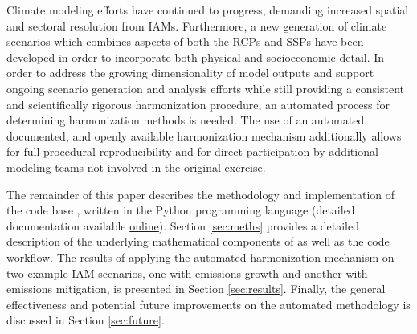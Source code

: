 Climate modeling efforts have continued to progress, demanding increased spatial
and sectoral resolution from IAMs. Furthermore, a new generation of climate
scenarios which combines aspects of both the RCPs and SSPs have been developed
in order to incorporate both physical and socioeconomic detail. In order to
address the growing dimensionality of model outputs and support ongoing scenario
generation and analysis efforts while still providing a consistent and
scientifically rigorous harmonization procedure, an automated process for
determining harmonization methods is needed. The use of an automated,
documented, and openly available harmonization mechanism additionally allows for
full procedural reproducibility and for direct participation by additional
modeling teams not involved in the original exercise.

The remainder of this paper describes the methodology and implementation of the
 code base \cite{matthew_gidden_2017_802832}, written in the Python
programming language (detailed documentation available
\href{http://mattgidden.com/aneris/}{online}). Section \ref{sec:meths} provides
a detailed description of the underlying mathematical components of
 as well as the code workflow. The results of applying the
automated harmonization mechanism on two example IAM scenarios, one with
emissions growth and another with emissions mitigation, is presented in Section
\ref{sec:results}. Finally, the general effectiveness and potential future
improvements on the automated methodology is discussed in Section
\ref{sec:future}.

